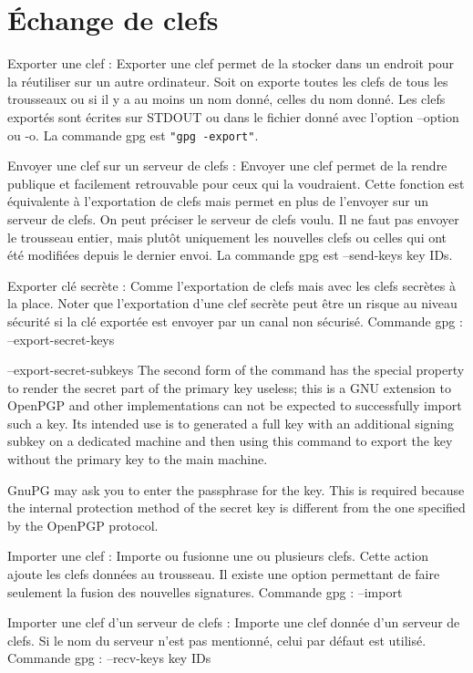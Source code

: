 \section{Échange de clefs}

Exporter une clef :
    Exporter une clef permet de la stocker dans un endroit pour la réutiliser sur un autre ordinateur.
    Soit on exporte toutes les clefs de tous les trousseaux ou si il y a au moins un nom donné, celles du nom donné. Les clefs exportés sont écrites
    sur STDOUT ou dans le fichier donné avec l'option --option ou -o.
    La commande gpg est \texttt{"gpg -\-export"}.

Envoyer une clef sur un serveur de clefs :
    Envoyer une clef permet de la rendre publique et facilement retrouvable pour ceux qui la voudraient.
    Cette fonction est équivalente à l'exportation de clefs mais permet en plus de l'envoyer sur un serveur de clefs. On peut préciser le
    serveur de clefs voulu. Il ne faut pas envoyer le trousseau entier, mais plutôt uniquement les nouvelles clefs ou celles qui ont été modifiées
    depuis le dernier envoi.
    La commande gpg est --send-keys key IDs.

Exporter clé secrète :
    Comme l'exportation de clefs mais avec les clefs secrètes à la place. Noter que l'exportation d'une clef secrète peut être un risque au niveau
    sécurité si la clé exportée est envoyer par un canal non sécurisé.
    Commande gpg : --export-secret-keys


--export-secret-subkeys
    The second form of the command has the special property to render the secret part of the primary key useless; this is a GNU extension to OpenPGP and other implementations can not be expected to successfully import such a key. Its intended use is to generated a full key with an additional signing subkey on a dedicated machine and then using this command to export the key without the primary key to the main machine.

    GnuPG may ask you to enter the passphrase for the key. This is required because the internal protection method of the secret key is different from the one specified by the OpenPGP protocol.

Importer une clef :
    Importe ou   fusionne une ou plusieurs clefs. Cette action ajoute les clefs données au trousseau.
    Il existe une option permettant de faire seulement la fusion des nouvelles signatures.
    Commande gpg : --import

Importer une clef d'un serveur de clefs : 
    Importe une clef donnée d'un serveur de clefs. Si le nom du serveur n'est pas mentionné, celui par défaut est utilisé.
    Commande gpg : --recv-keys key IDs


